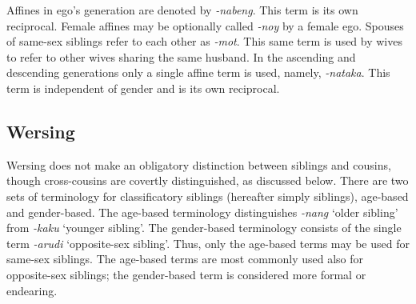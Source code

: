 Affines in ego's generation are denoted by \textit{-nabeng}. This term is its own reciprocal. Female affines may be optionally called \textit{-noy} by a female ego. Spouses of same-sex siblings refer to each other as \textit{-mot}. This same term is used by wives to refer to other wives sharing the same husband. In the ascending and descending generations only a single affine term is used, namely, \textit{-nataka}. This term is independent of gender and is its own reciprocal. 
 




\subsection{Wersing}\label{sect_wersing}
Wersing does not make an obligatory distinction between siblings and cousins, though cross-cousins are covertly distinguished, as discussed below. There are two sets of terminology for classificatory siblings (hereafter simply siblings), age-based and gender-based. The age-based terminology distinguishes \textit{-nang} `older sibling' from \textit{-kaku} `younger sibling'. The gender-based terminology consists of the single term \textit{-arudi} `opposite-sex sibling'. Thus, only the age-based terms may be used for same-sex siblings. The age-based terms are most commonly used also for opposite-sex siblings; the gender-based term is considered more formal or endearing.

